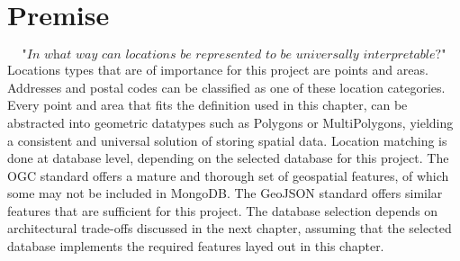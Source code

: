 \section{Premise}
\[\textit{"In what way can locations be represented to be universally interpretable?"}\] \hfill
Locations types that are of importance for this project are points and areas. Addresses and postal codes can be classified as one of these location categories. Every point and area that fits the definition used in this chapter, can be abstracted into geometric datatypes such as Polygons or MultiPolygons, yielding a consistent and universal solution of storing spatial data. Location matching is done at database level, depending on the selected database for this project. The OGC standard offers a mature and thorough set of geospatial features, of which some may not be included in MongoDB. The GeoJSON standard offers similar features that are sufficient for this project. The database selection depends on architectural trade-offs discussed in the next chapter, assuming that the selected database implements the required features layed out in this chapter.
